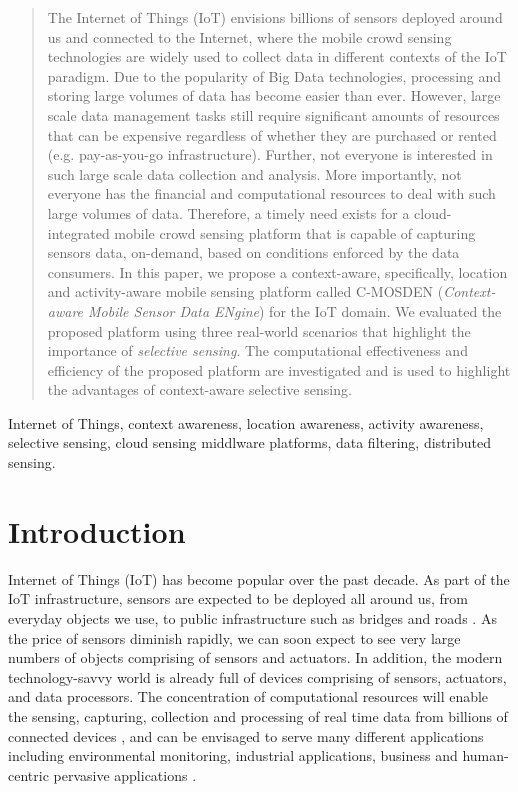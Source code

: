 \documentclass[journal]{IEEEtran}
\begin{document}
\begin{abstract}


The Internet of Things (IoT) envisions billions of sensors deployed around us and connected to the Internet, where the mobile crowd sensing technologies are widely used to collect data in different contexts of the IoT paradigm. Due to the popularity of Big Data technologies, processing and storing large volumes of data has become easier than ever. However,  large scale data management tasks still require significant amounts of resources that can be expensive regardless of  whether they are purchased or rented (e.g. pay-as-you-go infrastructure). Further, not everyone is interested in such large scale data collection and analysis. More importantly, not everyone has the financial and computational resources to deal with such large volumes of data. Therefore, a timely need exists for a cloud-integrated mobile crowd sensing  platform that is capable of capturing sensors data, on-demand, based  on conditions enforced by the data consumers. In this paper, we propose a context-aware, specifically, location and activity-aware mobile sensing platform called C-MOSDEN (\textit{Context-aware Mobile Sensor Data ENgine}) for the IoT domain. We evaluated the proposed platform using three real-world scenarios that highlight the importance of \textit{selective sensing}. The computational effectiveness and efficiency of the proposed platform are investigated and is used to highlight the advantages of context-aware selective sensing. 




\end{abstract}


\begin{IEEEkeywords}
Internet of Things, context awareness, location awareness, activity awareness,
selective sensing, cloud sensing middlware platforms, data filtering, distributed sensing.
\end{IEEEkeywords}






\IEEEpeerreviewmaketitle



\section{Introduction}
\label{sec:Introduction}
 Internet of Things (IoT) \cite{myIoT} has become popular over the past decade. As part of the IoT infrastructure, sensors are expected to be deployed all around us, from everyday objects we use, to public infrastructure such as bridges and roads \cite{H1, H2}. As the price of sensors diminish rapidly, we can soon expect to see very large numbers of objects comprising of sensors and actuators. In addition, the modern technology-savvy world is already full of devices comprising of sensors, actuators, and data processors. The concentration of computational resources will enable the sensing, capturing, collection and processing of real time data from billions of connected devices , and can be envisaged to serve   many different applications including environmental monitoring, industrial applications, business and human-centric pervasive applications \cite{ZMP003}.
\end{document}
